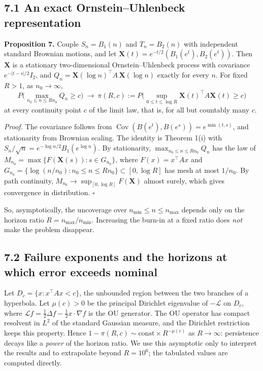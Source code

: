 \documentclass[
  10pt,
  a4paper,
]{article}
\begin{document}
\subsection{7.1 An exact Ornstein--Uhlenbeck
representation}\label{an-exact-ornsteinuhlenbeck-representation}

\textbf{Proposition 7.} Couple \(S_n=B_1(n)\) and \(T_n=B_2(n)\) with
independent standard Brownian motions, and let
\(\mathbf X(t)=e^{-t/2}(B_1(e^t),B_2(e^t))\). Then \(\mathbf X\) is a
stationary two-dimensional Ornstein--Uhlenbeck process with covariance
\(e^{-|t-s|/2}I_2\), and
\(Q_n=\mathbf X(\log n)^\top A\,\mathbf X(\log n)\) exactly for every
\(n\). For fixed \(R>1\), as \(n_0\to\infty\), \[
P\Big(\max_{n_0\le n\le Rn_0}Q_n\ge c\Big)\ \longrightarrow\ \pi(R,c):=P\Big(\sup_{0\le t\le\log R}\mathbf X(t)^\top A\mathbf X(t)\ge c\Big)
\] at every continuity point \(c\) of the limit law, that is, for all
but countably many \(c\).

\emph{Proof.} The covariance follows from
\(\operatorname{Cov}(B(e^t),B(e^s))=e^{\min(t,s)}\), and stationarity
from Brownian scaling. The identity is Theorem 1(i) with
\(S_n/\sqrt n=e^{-\log n/2}B_1(e^{\log n})\). By stationarity,
\(\max_{n_0\le n\le Rn_0}Q_n\) has the law of
\(M_{n_0}=\max\{F(\mathbf X(s)):s\in G_{n_0}\}\), where
\(F(x)=x^\top Ax\) and
\(G_{n_0}=\{\log(n/n_0):n_0\le n\le Rn_0\}\subset[0,\log R]\) has mesh
at most \(1/n_0\). By path continuity,
\(M_{n_0}\to\sup_{[0,\log R]}F(\mathbf X)\) almost surely, which gives
convergence in distribution. \(\square\)

So, asymptotically, the uncoverage over \(n_{\min}\le n\le n_{\max}\)
depends only on the horizon ratio \(R=n_{\max}/n_{\min}\). Increasing
the burn-in at a fixed ratio does \emph{not} make the problem disappear.

\subsection{7.2 Failure exponents and the horizons at which error
exceeds
nominal}\label{failure-exponents-and-the-horizons-at-which-error-exceeds-nominal}

Let \(D_c=\{x:x^\top Ax<c\}\), the unbounded region between the two
branches of a hyperbola. Let \(\mu(c)>0\) be the principal Dirichlet
eigenvalue of \(-\mathcal L\) on \(D_c\), where
\(\mathcal Lf=\tfrac12\Delta f-\tfrac12x\cdot\nabla f\) is the OU
generator. The OU operator has compact resolvent in \(L^2\) of the
standard Gaussian measure, and the Dirichlet restriction keeps this
property. Hence \(1-\pi(R,c)\sim\mathrm{const}\times R^{-\mu(c)}\) as
\(R\to\infty\): persistence decays like a \emph{power} of the horizon
ratio. We use this asymptotic only to interpret the results and to
extrapolate beyond \(R=10^6\); the tabulated values are computed
directly.
\end{document}
